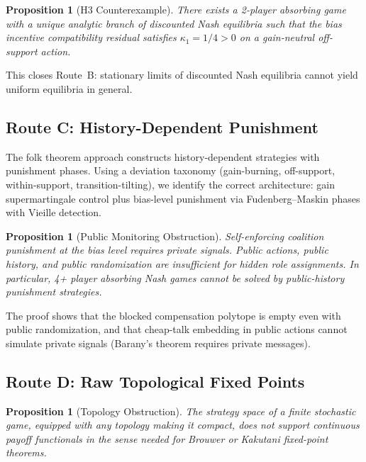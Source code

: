 \documentclass[12pt,a4paper]{article}
\newtheorem{proposition}[theorem]{Proposition}
\theoremstyle{definition}
\begin{document}
\begin{proposition}[H3 Counterexample]
\label{prop:h3-false}
There exists a 2-player absorbing game with a unique analytic branch of discounted Nash equilibria such that the bias incentive compatibility residual satisfies $\kappa_1 = 1/4 > 0$ on a gain-neutral off-support action.
\end{proposition}

This closes Route~B: stationary limits of discounted Nash equilibria cannot yield uniform equilibria in general.

\subsection{Route C: History-Dependent Punishment}
\label{sec:route-c}

The folk theorem approach constructs history-dependent strategies with punishment phases. Using a deviation taxonomy (gain-burning, off-support, within-support, transition-tilting), we identify the correct architecture: gain supermartingale control plus bias-level punishment via Fudenberg--Maskin phases with Vieille detection.

\begin{proposition}[Public Monitoring Obstruction]
\label{prop:route-c-dead}
Self-enforcing coalition punishment at the bias level requires private signals. Public actions, public history, and public randomization are insufficient for hidden role assignments. In particular, 4+ player absorbing Nash games cannot be solved by public-history punishment strategies.
\end{proposition}

The proof shows that the blocked compensation polytope is empty even with public randomization, and that cheap-talk embedding in public actions cannot simulate private signals (Barany's theorem requires private messages).

\subsection{Route D: Raw Topological Fixed Points}
\label{sec:route-d-raw}

\begin{proposition}[Topology Obstruction]
\label{prop:route-d-dead}
The strategy space of a finite stochastic game, equipped with any topology making it compact, does not support continuous payoff functionals in the sense needed for Brouwer or Kakutani fixed-point theorems.
\end{proposition}
\end{document}

